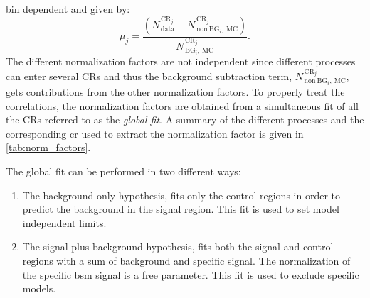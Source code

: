 bin dependent and given by:
\begin{equation}
  \label{eq:102}
  \mu_{j} = \frac{(N_\mathrm{\, data}^{\mathrm{\, CR}_j} - N_{\mathrm{\,
        non~BG}_i,~\mathrm{MC}}^{\mathrm{\, CR}_j})}{N^{\mathrm{\,
        CR}_j}_{\mathrm{\, BG}_i \mathrm{,~MC}}}.
\end{equation}
The different normalization factors are not independent since different
processes can enter several CRs and thus the background subtraction term,
$N_{\mathrm{\, non~BG}_i,~\mathrm{MC}}^{\mathrm{\, CR}_j}$, gets contributions
from the other normalization factors. To properly treat the correlations, the
normalization factors are obtained from a simultaneous fit of all the CRs
referred to as the \emph{global fit}. A summary of the different processes and
the corresponding \gls{cr} used to extract the normalization factor is given in
\cref{tab:norm_factors}.

The global fit can be performed in two different ways:
\begin{enumerate}
\item The background only hypothesis, fits only the control regions in order to
  predict the background in the signal region. This fit is used to set model
  independent limits.
\item The signal plus background hypothesis, fits both the signal and control
  regions with a sum of background and specific signal. The normalization of the
  specific \gls{bsm} signal is a free parameter. This fit is used to exclude
  specific models.
\end{enumerate}
\begin{table}[!th]
  \centering
  \caption{Summary table of the different background processes and the
    corresponding control regions used to evaluate the bin dependent
    normalization factors.}
  \label{tab:norm_factors}
\end{table}

